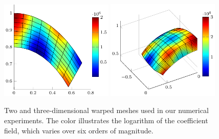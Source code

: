 \documentclass[smallcondensed,final]{svjour3}     %
\newcommand{\bs}[1]{\ensuremath{\boldsymbol #1}}
\begin{document}
\begin{figure}
	\includegraphics[width=0.48\textwidth]{figs/fan2d}
	\includegraphics[width=0.48\textwidth]{figs/fan3d}
	\caption{\label{fig:mesh} Two and three-dimensional warped
          meshes used in our numerical experiments. The color
          illustrates the logarithm of the coefficient field, which
          varies over six orders of magnitude.}
\end{figure}
\end{document}
